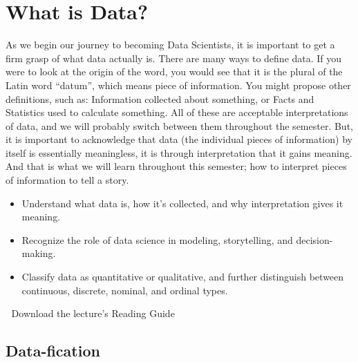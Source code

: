 \documentclass[
  letterpaper,
  DIV=11,
  numbers=noendperiod]{scrreprt}
\providecommand{\tightlist}{%
  \setlength{\itemsep}{0pt}\setlength{\parskip}{0pt}}
\begin{document}

\chapter{What is Data?}\label{what-is-data}

As we begin our journey to becoming Data Scientists, it is important to
get a firm grasp of what data actually is. There are many ways to define
data. If you were to look at the origin of the word, you would see that
it is the plural of the Latin word ``datum'', which means piece of
information. You might propose other definitions, such as: Information
collected about something, or Facts and Statistics used to calculate
something. All of these are acceptable interpretations of data, and we
will probably switch between them throughout the semester. But, it is
important to acknowledge that data (the individual pieces of
information) by itself is essentially meaningless, it is through
interpretation that it gains meaning. And that is what we will learn
throughout this semester; how to interpret pieces of information to tell
a story.

\begin{itemize}
\tightlist
\item
  Understand what data is, how it's collected, and why interpretation
  gives it meaning.
\item
  Recognize the role of data science in modeling, storytelling, and
  decision-making.
\item
  Classify data as quantitative or qualitative, and further distinguish
  between continuous, discrete, nominal, and ordinal types.
\end{itemize}

\begin{tcolorbox}[enhanced jigsaw, leftrule=.75mm, arc=.35mm, coltitle=black, rightrule=.15mm, bottomrule=.15mm, toprule=.15mm, left=2mm, colbacktitle=quarto-callout-tip-color!10!white, title=\textcolor{quarto-callout-tip-color}{\faLightbulb}\hspace{0.5em}{Supplemental Material}, toptitle=1mm, breakable, colframe=quarto-callout-tip-color-frame, bottomtitle=1mm, titlerule=0mm, colback=white, opacityback=0, opacitybacktitle=0.6]

📄 Download the lecture's Reading Guide

\end{tcolorbox}

\section{Data-fication}\label{data-fication}
\end{document}
